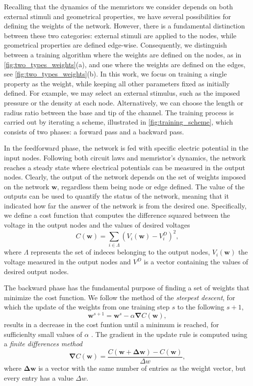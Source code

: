 \documentclass[reprint,superscriptaddress,prb,showkeys]{revtex4-2}
\newcommand{\brac}[1]{\left(#1 \right)} %
\begin{document}
Recalling that the dynamics of the memristors we consider depends on both external stimuli and geometrical properties, we have several possibilities for defining the weights of the network. However, there is a fundamental distinction between these two categories: external stimuli are applied to the nodes, while geometrical properties are defined edge-wise. Consequently, we distinguish between a training algorithm where the weights are defined on the nodes, as in \cref{fig:two_types_weights}(a), and one where the weights are defined on the edges, see \cref{fig:two_types_weights}(b). In this work, we focus on training a single property as the weight, while keeping all other parameters fixed as initially defined. For example, we may select an external stimulus, such as the imposed pressure or the density at each node. Alternatively, we can choose the length or radius ratio between the base and tip of the channel. The training process is carried out by iterating a scheme, illustrated in \cref{fig:training_scheme}, which consists of two phases: a forward pass and a backward pass.

In the feedforward phase, the network is fed with specific electric potential in the input nodes. Following both circuit laws and memristor's dynamics, the network reaches a steady state where electrical potentials can be measured in the output nodes. Clearly, the output of the network depends on the set of weights imposed on the network $\boldsymbol{w}$, regardless them being node or edge defined. The value of the outputs can be used to quantify the status of the network, meaning that it indicated how far the answer of the network is from the desired one. Specifically, we define a cost function that computes the difference squared between the voltage in the output nodes and the values of desired voltages
\[
C\left( \boldsymbol{w} \right) = \sum_{i \in \Lambda} \brac{V_i\brac{\boldsymbol{w}} - V_i^D}^2,
\]
where $\Lambda$ represents the set of indeces belonging to the output nodes, $V_i\brac{\boldsymbol{w}}$ the voltage measured in the output nodes and $V^D$ is a vector containing the values of desired output nodes.

The backward phase has the fundamental purpose of finding a set of weights that minimize the cost function. We follow the method of the \textit{steepest descent}, for which the update of the weights from one training step $s$ to the following $s+1$,
\begin{equation}
\boldsymbol{w}^{s+1} = \boldsymbol{w}^{s} - \alpha \boldsymbol{\nabla}C\brac{\boldsymbol{w}},
\label{eq:weight_update}
\end{equation}
results in a decrease in the cost funtion until a minimum is reached, for sufficienlty small values of $\alpha$ \cite{steepest_descent_book}. The gradient in the update rule is computed using a \textit{finite differences method}
\begin{equation}
\boldsymbol{\nabla}C\brac{\boldsymbol{w}} = \frac{C\brac{\boldsymbol{w}+\boldsymbol{\Delta w}}-C\brac{\boldsymbol{w}}}{\Delta w},
\label{eq:gradient_cost_func}
\end{equation}
where $\boldsymbol{\Delta w}$ is a vector with the same number of entries as the weight vector, but every entry has a value $\Delta w$. 
\end{document}

